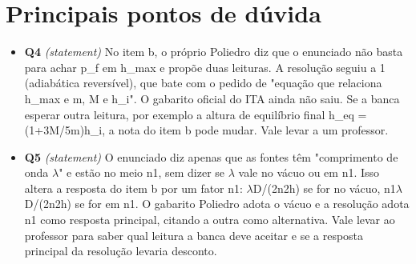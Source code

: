 \documentclass{article}%
\begin{document}
\section*{Principais pontos de dúvida}%
\begin{itemize}%
\item%
\textbf{Q4} \textit{(statement)} No item b, o próprio Poliedro diz que o enunciado não basta para achar p\_f em h\_max e propõe duas leituras. A resolução seguiu a 1 (adiabática reversível), que bate com o pedido de "equação que relaciona h\_max e m, M e h\_i". O gabarito oficial do ITA ainda não saiu. Se a banca esperar outra leitura, por exemplo a altura de equilíbrio final h\_eq = (1+3M/5m)h\_i, a nota do item b pode mudar. Vale levar a um professor.%
\item%
\textbf{Q5} \textit{(statement)} O enunciado diz apenas que as fontes têm "comprimento de onda $\lambda$" e estão no meio n1, sem dizer se $\lambda$ vale no vácuo ou em n1. Isso altera a resposta do item b por um fator n1: $\lambda$D/(2n2h) se for no vácuo, n1$\lambda$D/(2n2h) se for em n1. O gabarito Poliedro adota o vácuo e a resolução adota n1 como resposta principal, citando a outra como alternativa. Vale levar ao professor para saber qual leitura a banca deve aceitar e se a resposta principal da resolução levaria desconto.%
\end{itemize}%
\end{document}
